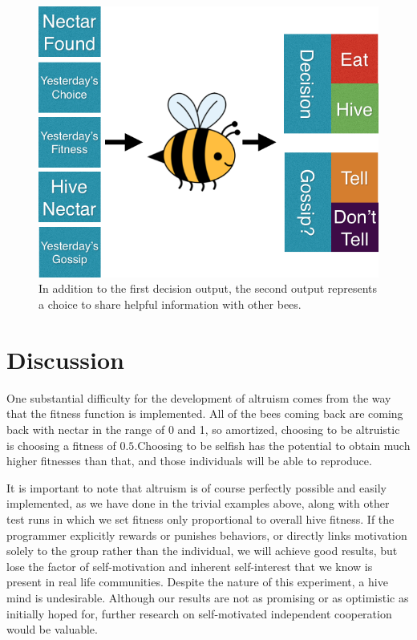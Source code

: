 \documentclass[11pt]{article}
\begin{document}
			\begin{figure}[tb]
				\begin{center}
					\includegraphics[scale=.5]{bee_diagrams/gossip_system.png}
				\end{center}
				\caption{In addition to the first decision output, the second output represents a choice to share helpful information with other bees.}
				\label{fig:gossip_system}
			\end{figure}



	\section{Discussion} %
	\label{sec:discussion}
		One substantial difficulty for the development of altruism comes from the way that the fitness function is implemented. All of the bees coming back are coming back with nectar in the range of 0 and 1, so amortized, choosing to be altruistic is choosing a fitness of $0.5$.Choosing to be selfish has the potential to obtain much higher
		fitnesses than that, and those individuals will be able to reproduce.

		It is important to note that altruism is of course perfectly possible and easily implemented, as we have done in the trivial examples above, along with other test runs in which we set fitness only proportional to overall hive fitness. If the programmer explicitly rewards or punishes behaviors, or directly links motivation solely to the group rather than the individual, we will achieve good results, but lose the factor of self-motivation and inherent self-interest that we know is present in real life communities. Despite the nature of this experiment, a hive mind is undesirable. Although our results are not as promising or as optimistic as initially hoped for, further research on self-motivated independent cooperation would be valuable. 
\end{document}
